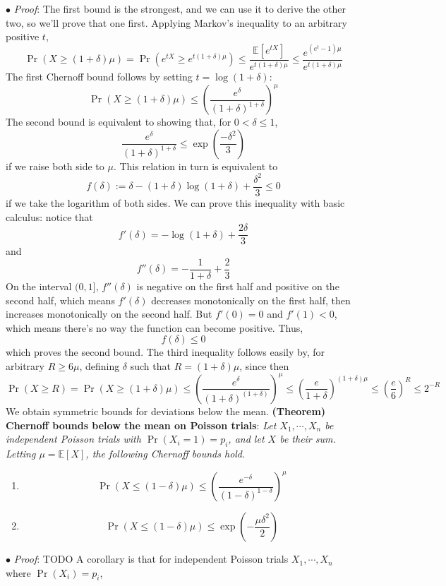 \documentclass{article}
\newcommand*{\tb}{\textbf}
\newcommand*{\ti}{\textit}
\newcommand*{\nn}{\newline \newline}
\newcommand*{\Pf}{\indent \ensuremath{\bullet} \textit{Proof}: }
\newcommand*{\E}{\mathbb{E}}
\begin{document}
\Pf The first bound is the strongest, and we can use it to derive the other two, so we'll prove that one first. Applying Markov's inequality to an arbitrary positive $ t $,
$$ \Pr(X \geq (1 + \delta) \mu) = \Pr(e^{t X} \geq e^{t (1 + \delta) \mu}) \leq \frac{\E[e^{t X}]}{e^{t (1 + \delta) \mu}} \leq \frac{e^{(e^t - 1) \mu}}{e^{t (1 + \delta) \mu}} $$
The first Chernoff bound follows by setting $ t = \log(1 + \delta) $:
$$ \Pr(X \geq (1 + \delta) \mu) \leq \left( \frac{e^\delta}{(1 + \delta)^{1 + \delta}} \right)^\mu $$
The second bound is equivalent to showing that, for $ 0 < \delta \leq 1 $,
$$ \frac{e^\delta}{(1 + \delta)^{1 + \delta}} \leq \exp(\frac{- \delta^2}{3}) $$
if we raise both side to $ \mu $. This relation in turn is equivalent to
$$ f(\delta) := \delta - (1 + \delta) \log(1 + \delta) + \frac{\delta^2}{3} \leq 0 $$
if we take the logarithm of both sides. We can prove this inequality with basic calculus: notice that
$$ f'(\delta) = - \log(1 + \delta) + \frac{2 \delta}{3} $$
and
$$ f''(\delta) = - \frac{1}{1 + \delta} + \frac{2}{3} $$
On the interval $ (0, 1] $, $ f''(\delta) $ is negative on the first half and positive on the second half, which means $ f'(\delta) $ decreases monotonically on the first half, then increases monotonically on the second half. But $ f'(0) = 0 $ and $ f'(1) < 0 $, which means there's no way the function can become positive. Thus, $$ f(\delta) \leq 0 $$
which proves the second bound. The third inequality follows easily by, for arbitrary $ R \geq 6 \mu $, defining $ \delta $ such that $ R = (1 + \delta) \mu $, since then
$$ \Pr(X \geq R) = \Pr(X \geq (1 + \delta) \mu) \leq \left( \frac{e^\delta}{(1 + \delta)^{(1 + \delta)}} \right)^\mu \leq \left( \frac{e}{1 + \delta} \right)^{(1 + \delta) \mu} \leq \left( \frac{e}{6} \right)^R \leq 2^{-R} $$
\qedsymbol
\nn
We obtain symmetric bounds for deviations below the mean.
\nn
\tb{(Theorem) Chernoff bounds below the mean on Poisson trials}: \ti{Let $ X_1, \cdots, X_n $ be independent Poisson trials with $ \Pr(X_i = 1) = p_i $, and let $ X $ be their sum. Letting $ \mu = \E[X] $, the following Chernoff bounds hold.}
\begin{enumerate}
    \item $$ \Pr(X \leq (1 - \delta) \mu) \leq \left( \frac{e^{- \delta}}{(1 - \delta)^{1 - \delta}} \right)^\mu $$
    \item $$ \Pr(X \leq (1 - \delta) \mu) \leq \exp \left( - \frac{\mu \delta^2}{2} \right) $$
\end{enumerate}
\Pf TODO
\nn
A corollary is that for independent Poisson trials $ X_1, \cdots, X_n$ where $ \Pr(X_i) = p_i $,
\end{document}
